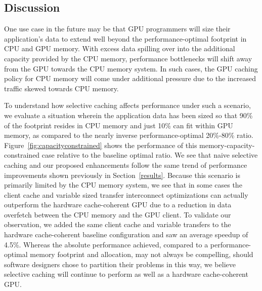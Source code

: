 \subsection {Discussion}
One use case in the future
may be that GPU programmers will size their application's data to extend well beyond
the performance-optimal footprint in CPU and GPU memory.  With excess data spilling over
into the additional capacity provided by the CPU memory, performance
bottlenecks will shift away from the GPU towards the CPU memory system.  In such
cases, the GPU caching policy for CPU memory will come under additional pressure due to
the increased traffic skewed towards CPU memory.

To understand how selective caching affects performance under such a scenario, we evaluate
a situation wherein the application data has been
sized so that 90\% of the footprint resides in CPU memory and just 10\% can fit within GPU memory, as compared to the nearly
inverse performance-optimal 20\%-80\% ratio.
Figure~\ref{fig:capacityconstrained} shows the performance of this memory-capacity-constrained case relative 
to the baseline optimal ratio.  We see that naive selective caching and
our proposed enhancements follow the same trend of performance improvements
shown previously in Section~\ref{results}.  Because this scenario is primarily limited
by the CPU memory system, we see that in some cases the client cache and variable sized transfer interconnect optimizations
can actually outperform the hardware cache-coherent GPU due to a reduction in data overfetch between the CPU memory and the GPU client.
To validate our observation, we added the same client cache and variable
transfers to the hardware cache-coherent baseline configuration and saw an average
speedup of 4.5\%.  Whereas the absolute
performance achieved, compared to a performance-optimal memory footprint and allocation, may not always be compelling, should
software designers chose to partition their problems in this way, we believe selective caching will continue to 
perform as well as a hardware cache-coherent GPU.


